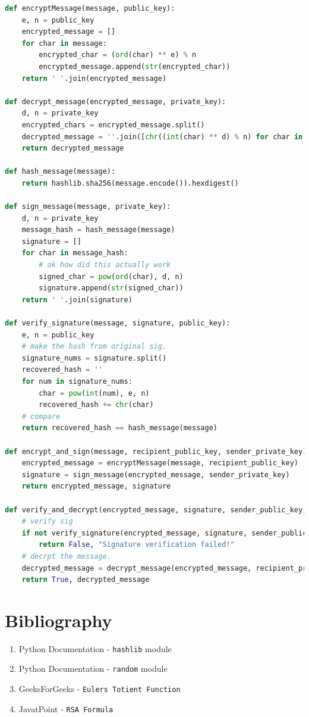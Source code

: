 \documentclass[12pt,a4paper]{report}
\begin{document}
\begin{lstlisting}[language=Python]
def encryptMessage(message, public_key):
    e, n = public_key
    encrypted_message = []
    for char in message:
        encrypted_char = (ord(char) ** e) % n
        encrypted_message.append(str(encrypted_char))
    return ' '.join(encrypted_message)

def decrypt_message(encrypted_message, private_key):
    d, n = private_key
    encrypted_chars = encrypted_message.split()
    decrypted_message = ''.join([chr((int(char) ** d) % n) for char in encrypted_chars])
    return decrypted_message

def hash_message(message):
    return hashlib.sha256(message.encode()).hexdigest()

def sign_message(message, private_key):
    d, n = private_key
    message_hash = hash_message(message)
    signature = []
    for char in message_hash:
        # ok how did this actually work
        signed_char = pow(ord(char), d, n)
        signature.append(str(signed_char))
    return ' '.join(signature)

def verify_signature(message, signature, public_key):
    e, n = public_key
    # make the hash from original sig.
    signature_nums = signature.split()
    recovered_hash = ''
    for num in signature_nums:
        char = pow(int(num), e, n)
        recovered_hash += chr(char)
    # compare
    return recovered_hash == hash_message(message)

def encrypt_and_sign(message, recipient_public_key, sender_private_key):
    encrypted_message = encryptMessage(message, recipient_public_key)
    signature = sign_message(encrypted_message, sender_private_key)
    return encrypted_message, signature

def verify_and_decrypt(encrypted_message, signature, sender_public_key, recipient_private_key):
    # verify sig
    if not verify_signature(encrypted_message, signature, sender_public_key):
        return False, "Signature verification failed!"
    # decrpt the message.
    decrypted_message = decrypt_message(encrypted_message, recipient_private_key)
    return True, decrypted_message
\end{lstlisting}

\chapter{Bibliography}
\begin{enumerate}
    \item Python Documentation - \texttt{hashlib} module
    \item Python Documentation - \texttt{random} module
    \item GeeksForGeeks - \texttt{Eulers Totient Function}
    \item JavatPoint - \texttt{RSA Formula}
\end{enumerate}
\end{document}
